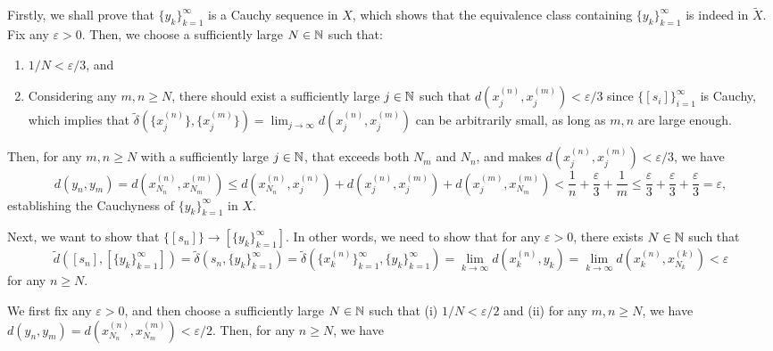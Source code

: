 \begin{enumerate}
\begin{pf}
Firstly, we shall prove that \(\{y_k\}_{k=1}^{\infty}\) is a Cauchy sequence in
\(X\), which shows that the equivalence class containing
\(\{y_k\}_{k=1}^{\infty}\) is indeed in \(\widetilde{X}\).  Fix any
\(\varepsilon>0\). Then, we choose a sufficiently large \(N\in\mathbb{N}\) such that:
\begin{enumerate}
\item \(1/N<\varepsilon/3\), and
\item Considering any \(m,n\ge N\), there should exist a sufficiently large
\(j\in\mathbb{N}\) such that \(d(x_j^{(n)},x_j^{(m)})<\varepsilon/3\) since
\(\{[s_i]\}_{i=1}^{\infty}\) is Cauchy, which implies that
\(\widetilde{\delta}(\{x_j^{(n)}\},\{x_j^{(m)}\})=\lim_{j\to
\infty}d(x_j^{(n)},x_j^{(m)})\) can be arbitrarily small, as long as \(m,n\)
are large enough.
\end{enumerate}
Then, for any \(m,n\ge N\) with a sufficiently large \(j\in\mathbb{N}\), that exceeds
both \(N_m\) and \(N_n\), and makes \(d(x_j^{(n)},x_j^{(m)})<\varepsilon/3\),
we have
\[
d(y_n,y_m)=d(x_{N_n}^{(n)},x_{N_m}^{(m)})
\le
d(x_{N_n}^{(n)},x_j^{(n)})+d(x_j^{(n)},x_j^{(m)})+d(x_j^{(m)},x_{N_m}^{(m)})
<\frac{1}{n}+\frac{\varepsilon}{3}+\frac{1}{m}
\le\frac{\varepsilon}{3}+\frac{\varepsilon}{3}+\frac{\varepsilon}{3}
=\varepsilon,
\]
establishing the Cauchyness of \(\{y_k\}_{k=1}^{\infty}\) in \(X\).

Next, we want to show that \(\{[s_n]\}\to [\{y_k\}_{k=1}^{\infty}]\). In other
words, we need to show that for any \(\varepsilon>0\), there exists \(N\in\mathbb{N}\)
such that
\[
\widetilde{d}([s_n],[\{y_k\}_{k=1}^{\infty}])
=\widetilde{\delta}(s_n,\{y_k\}_{k=1}^{\infty})
=\widetilde{\delta}(\{x_k^{(n)}\}_{k=1}^{\infty},\{y_k\}_{k=1}^{\infty})
=\lim_{k\to \infty}d(x_k^{(n)},y_k)
=\lim_{k\to \infty}d(x_k^{(n)},x_{N_k}^{(k)})
<\varepsilon
\]
for any \(n\ge N\).

We first fix any \(\varepsilon>0\), and then choose a sufficiently large
\(N\in\mathbb{N}\) such that (i) \(1/N<\varepsilon/2\) and (ii) for any \(m,n\ge N\),
we have \(d(y_n,y_m)=d(x_{N_n}^{(n)},x_{N_m}^{(m)})<\varepsilon/2\). Then, for any
\(n\ge N\), we have


\end{pf}
\end{enumerate}

